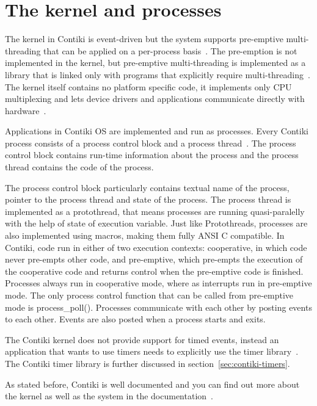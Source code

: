 
\section{The kernel and processes}
The kernel in Contiki is event-driven but the system supports pre-emptive
multi-threading that can be applied on a per-process basis~\cite{video}.
The pre-emption is not implemented in the kernel, but
pre-emptive multi-threading is implemented as a library that is linked only with programs that
explicitly require multi-threading~\cite{paper-contiki}.
The kernel itself contains no platform specific code, it implements only CPU multiplexing and
lets device drivers and applications communicate directly with hardware~\cite{video}.

Applications in Contiki OS are implemented and run as processes.
Every Contiki process consists of a process control block and a process thread~\cite{contiki-wiki-processes}.
The process control block contains run-time information about the process and
the process thread contains the code of the process.

The process control block particularly contains
textual name of the process, pointer to the process thread and state of the process.
The process thread is implemented as a protothread,
that means processes are running quasi-paralelly with the help of state of execution variable.
Just like Protothreads, processes are also implemented using macros, making them fully ANSI C compatible.
In Contiki, code run in either of two execution contexts:
cooperative, in which code never pre-empts other code, and pre-emptive,
which pre-empts the execution of the cooperative code and returns control
when the pre-emptive code is finished.
Processes always run in cooperative mode, where as interrupts run in pre-emptive mode.
The only process control function that can be called from pre-emptive mode is process\_poll(). 
Processes communicate with each other by posting events to each other.
Events are also posted when a process starts and exits.

The Contiki kernel does not provide support for timed events,
instead an application that wants to use timers needs to explicitly use the timer library~\cite{contiki-docs}.
The Contiki timer library is further discussed in section~\ref{sec:contiki-timers}.

As stated before, Contiki is well documented and you can find out more about
the kernel as well as the system in the documentation~\cite{contiki-docs}.
